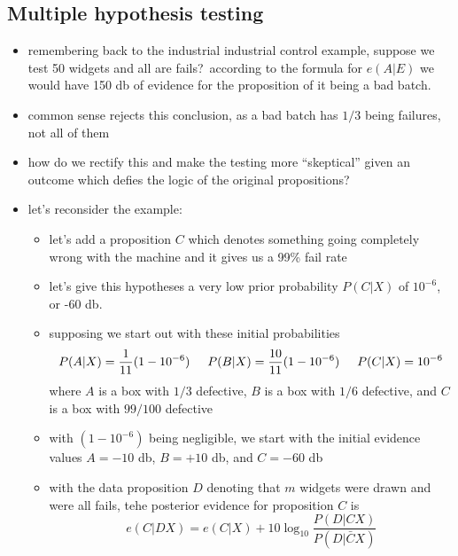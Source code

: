 \documentclass[../jaynes_prob_theory_notes.tex]{subfiles}
\begin{document}
\subsection{Multiple hypothesis testing}
    \begin{itemize}
        \item remembering back to the industrial industrial control example, suppose we test 50 widgets and all are fails?\ according to the formula for $e(A|E)$ we would have 150 db of evidence for the proposition of it being a bad batch.
        \item common sense rejects this conclusion, as a bad batch has $1/3$ being failures, not all of them
        \item how do we rectify this and make the testing more ``skeptical'' given an outcome which defies the logic of the original propositions?
        \item let's reconsider the example:
            \begin{itemize}
                \item let's add a proposition $C$ which denotes something going completely wrong with the machine and it gives us a 99\% fail rate
                \item let's give this hypotheses a very low prior probability $P(C|X)$ of $10^{-6}$, or -60 db.
                \item supposing we start out with these initial probabilities
                    \begin{equation*}
                        P(A|X) = \frac{1}{11}(1-10^{-6}) \hspace{0.5cm} P(B|X) = \frac{10}{11}(1-10^{-6}) \hspace{0.5cm} P(C|X) = 10^{-6}
                    \end{equation*}
                where $A$ is a box with $1/3$ defective, $B$ is a box with $1/6$ defective, and $C$ is a box with $99/100$ defective
                \item with $(1-10^{-6})$ being negligible, we start with the initial evidence values $A=-10$ db, $B=+10$ db, and $C=-60$ db
                \item with the data proposition $D$ denoting that $m$ widgets were drawn and were all fails, tehe posterior evidence for proposition $C$ is 
                    \begin{equation*}
                        e(C|DX) = e(C|X) + 10\log_{10} \frac{P(D|CX)}{P(D|\bar{C}X)}
                    \end{equation*}

\end{itemize}
\end{itemize}
\end{document}
